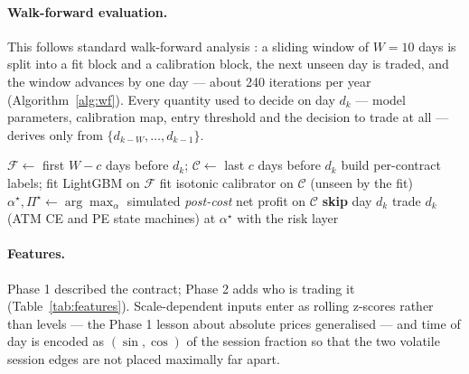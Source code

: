 \documentclass[10pt,a4paper]{article}
\begin{document}
\paragraph{Walk-forward evaluation.} This follows standard walk-forward
analysis \cite{pardo}: a sliding window of
$W=10$ days is split into a fit block and a calibration block, the next unseen
day is traded, and the window advances by one day --- about 240 iterations per
year (Algorithm~\ref{alg:wf}). Every quantity used to decide on day $d_k$ ---
model parameters, calibration map, entry threshold and the decision to trade at
all --- derives only from $\{d_{k-W},\dots,d_{k-1}\}$.

\begin{algorithm}[H]
\small
\caption{Walk-forward evaluation with calibration, threshold search and abstention}
\label{alg:wf}
\begin{algorithmic}[1]
  \State $\mathcal{F} \gets$ first $W-c$ days before $d_k$;\quad
         $\mathcal{C} \gets$ last $c$ days before $d_k$ 
  \State build per-contract labels; fit LightGBM on $\mathcal{F}$
  \State fit isotonic calibrator on $\mathcal{C}$ (unseen by the fit)
  \State $\alpha^{\star},\Pi^{\star} \gets \arg\max_{\alpha}$ simulated
         \emph{post-cost} net profit on $\mathcal{C}$
   \textbf{skip} day $d_k$
  \Else{} trade $d_k$ (ATM CE and PE state machines) at $\alpha^{\star}$ with the risk layer
  \EndIf
\EndFor
\end{algorithmic}
\end{algorithm}

\paragraph{Features.} Phase 1 described the contract; Phase 2 adds who is
trading it (Table~\ref{tab:features}). Scale-dependent inputs enter as rolling
z-scores rather than levels --- the Phase 1 lesson about absolute prices
generalised --- and time of day is encoded as $(\sin,\cos)$ of the session
fraction so that the two volatile session edges are not placed maximally far
apart.
\end{document}
